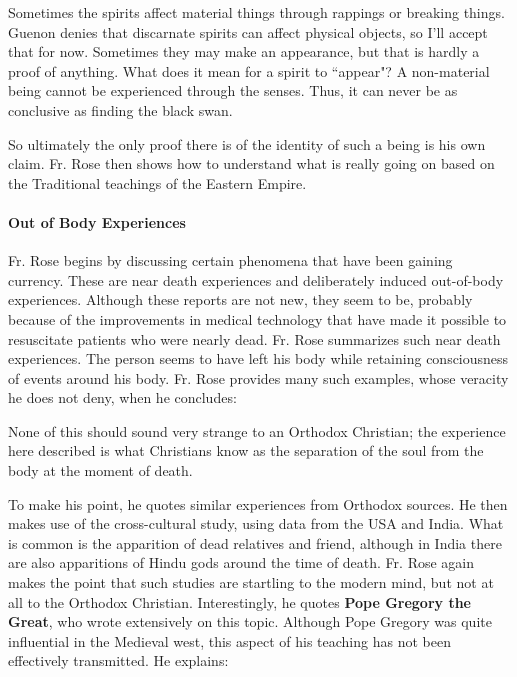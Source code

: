 Sometimes the spirits affect material things through rappings or breaking things. Guenon denies that discarnate spirits can affect physical objects, so I'll accept that for now. Sometimes they may make an appearance, but that is hardly a proof of anything. What does it mean for a spirit to ``appear"? A non-material being cannot be experienced through the senses. Thus, it can never be as conclusive as finding the black swan.

So ultimately the only proof there is of the identity of such a being is his own claim. Fr. Rose then shows how to understand what is really going on based on the Traditional teachings of the Eastern Empire.

\paragraph{Out of Body Experiences}
Fr. Rose begins by discussing certain phenomena that have been gaining currency. These are near death experiences and deliberately induced out-of-body experiences. Although these reports are not new, they seem to be, probably because of the improvements in medical technology that have made it possible to resuscitate patients who were nearly dead. Fr. Rose summarizes such near death experiences. The person seems to have left his body while retaining consciousness of events around his body. Fr. Rose provides many such examples, whose veracity he does not deny, when he concludes:

\begin{quotex}
None of this should sound very strange to an Orthodox Christian; the experience here described is what Christians know as the separation of the soul from the body at the moment of death. 

\end{quotex}
To make his point, he quotes similar experiences from Orthodox sources. He then makes use of the cross-cultural study, using data from the USA and India. What is common is the apparition of dead relatives and friend, although in India there are also apparitions of Hindu gods around the time of death. Fr. Rose again makes the point that such studies are startling to the modern mind, but not at all to the Orthodox Christian. Interestingly, he quotes \textbf{Pope Gregory the Great}, who wrote extensively on this topic. Although Pope Gregory was quite influential in the Medieval west, this aspect of his teaching has not been effectively transmitted. He explains:

